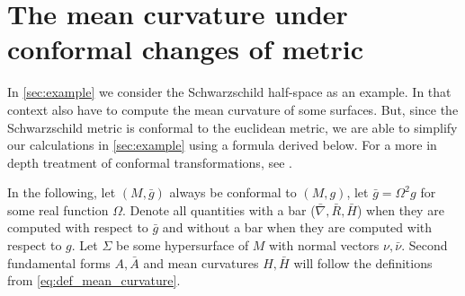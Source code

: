 \documentclass[titlepage,numbers=noenddot,headinclude,oneside,%
footinclude=true,cleardoublepage=empty,%
BCOR=5mm,paper=a4,fontsize=11pt,%
english,%
]{scrartcl}
\begin{document}
\section{The mean curvature under conformal changes of metric}\label{sec:conformal_changes_of_metric}
In \cref{sec:example} we consider the Schwarzschild half-space as an example. In that context also have to compute the mean curvature of some surfaces. But, since the Schwarzschild metric is conformal to the euclidean metric, we are able to simplify our calculations in \cref{sec:example} using a formula derived below. For a more in depth treatment of conformal transformations, see \cite{curryIntroductionConformalGeometry2015}.


In the following, let \( (M,\bar{g}) \) always be conformal to \( (M,g) \), \ie let \( \bar{g}=\Omega^2 g \) for some real function \( \Omega \). Denote all quantities with a bar (\eg \( \bar{\nabla},\bar{R},\bar{H} \)) when they are computed with respect to \( \bar{g} \) and without a bar when they are computed with respect to \( g \). Let \( \Sigma \) be some hypersurface of \( M \) with normal vectors \( \nu,\bar{\nu} \). Second fundamental forms \( A,\bar{A} \) and mean curvatures \( H,\bar{H} \) will follow the definitions from \cref{eq:def_mean_curvature}.
\end{document}
